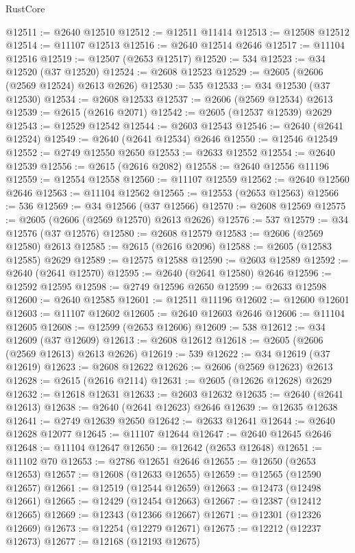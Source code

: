 \begin{lexlean}{RustCore}
\begin{coremodule}
@12511 := @2640 @12510
@12512 := @12511 @11414
@12513 := @12508 @12512
@12514 := @11107 @12513
@12516 := @2640 @12514 @2646
@12517 := @11104 @12516
@12519 := @12507 (@2653 @12517)
@12520 := 534
@12523 := @34 @12520 (@37 @12520)
@12524 := @2608 @12523
@12529 := @2605 (@2606 (@2569 @12524) @2613 @2626)
@12530 := 535
@12533 := @34 @12530 (@37 @12530)
@12534 := @2608 @12533
@12537 := @2606 (@2569 @12534) @2613
@12539 := @2615 (@2616 @2071)
@12542 := @2605 (@12537 @12539) @2629
@12543 := @12529 @12542
@12544 := @2603 @12543
@12546 := @2640 (@2641 @12524)
@12549 := @2640 (@2641 @12534) @2646
@12550 := @12546 @12549
@12552 := @2749 @12550 @2650
@12553 := @2633 @12552
@12554 := @2640 @12539
@12556 := @2615 (@2616 @2082)
@12558 := @2640 @12556 @11196
@12559 := @12554 @12558
@12560 := @11107 @12559
@12562 := @2640 @12560 @2646
@12563 := @11104 @12562
@12565 := @12553 (@2653 @12563)
@12566 := 536
@12569 := @34 @12566 (@37 @12566)
@12570 := @2608 @12569
@12575 := @2605 (@2606 (@2569 @12570) @2613 @2626)
@12576 := 537
@12579 := @34 @12576 (@37 @12576)
@12580 := @2608 @12579
@12583 := @2606 (@2569 @12580) @2613
@12585 := @2615 (@2616 @2096)
@12588 := @2605 (@12583 @12585) @2629
@12589 := @12575 @12588
@12590 := @2603 @12589
@12592 := @2640 (@2641 @12570)
@12595 := @2640 (@2641 @12580) @2646
@12596 := @12592 @12595
@12598 := @2749 @12596 @2650
@12599 := @2633 @12598
@12600 := @2640 @12585
@12601 := @12511 @11196
@12602 := @12600 @12601
@12603 := @11107 @12602
@12605 := @2640 @12603 @2646
@12606 := @11104 @12605
@12608 := @12599 (@2653 @12606)
@12609 := 538
@12612 := @34 @12609 (@37 @12609)
@12613 := @2608 @12612
@12618 := @2605 (@2606 (@2569 @12613) @2613 @2626)
@12619 := 539
@12622 := @34 @12619 (@37 @12619)
@12623 := @2608 @12622
@12626 := @2606 (@2569 @12623) @2613
@12628 := @2615 (@2616 @2114)
@12631 := @2605 (@12626 @12628) @2629
@12632 := @12618 @12631
@12633 := @2603 @12632
@12635 := @2640 (@2641 @12613)
@12638 := @2640 (@2641 @12623) @2646
@12639 := @12635 @12638
@12641 := @2749 @12639 @2650
@12642 := @2633 @12641
@12644 := @2640 @12628 @12077
@12645 := @11107 @12644
@12647 := @2640 @12645 @2646
@12648 := @11104 @12647
@12650 := @12642 (@2653 @12648)
@12651 := @11102 @70
@12653 := @2786 @12651 @2646
@12655 := @12650 (@2653 @12653)
@12657 := @12608 (@12633 @12655)
@12659 := @12565 (@12590 @12657)
@12661 := @12519 (@12544 @12659)
@12663 := @12473 (@12498 @12661)
@12665 := @12429 (@12454 @12663)
@12667 := @12387 (@12412 @12665)
@12669 := @12343 (@12366 @12667)
@12671 := @12301 (@12326 @12669)
@12673 := @12254 (@12279 @12671)
@12675 := @12212 (@12237 @12673)
@12677 := @12168 (@12193 @12675)

\end{coremodule}
\end{lexlean}
